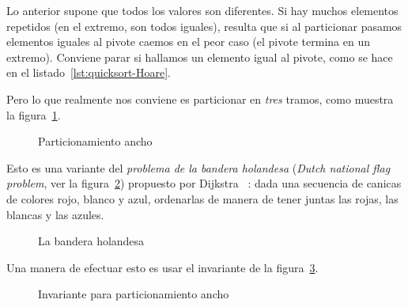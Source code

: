   Lo anterior supone que todos los valores son diferentes.
  Si hay muchos elementos repetidos
  (en el extremo,
   son todos iguales),
  resulta que si al particionar pasamos elementos iguales al pivote
  caemos en el peor caso
  (el pivote termina en un extremo).
  Conviene parar si hallamos un elemento igual al pivote,
  como se hace en el listado~\ref{lst:quicksort-Hoare}.

  Pero lo que realmente nos conviene es particionar en \emph{tres} tramos,
  como muestra la figura~\ref{fig:fat-partition}.
  \begin{figure}[htbp]
    \centering
    \caption{Particionamiento ancho}
    \label{fig:fat-partition}
  \end{figure}
  Esto es una variante del \emph{problema de la bandera holandesa}
  (\emph{\foreignlanguage{english}{Dutch national flag problem}},
   ver la figura~\ref{fig:dutch-flag})
  propuesto por Dijkstra~%
    \cite{dijkstra76:_discipline_programming}:
  dada una secuencia de canicas de colores rojo, blanco y azul,
  ordenarlas de manera de tener juntas las rojas, las blancas y las azules.
  \begin{figure}[ht]
    \centering
    \caption{La bandera holandesa}
    \label{fig:dutch-flag}
  \end{figure}
  Una manera de efectuar esto
  es usar el invariante de la figura~\ref{fig:fat-partition-invariant}.
  \begin{figure}[ht]
    \centering
    \caption{Invariante para particionamiento ancho}
    \label{fig:fat-partition-invariant}
  \end{figure}
